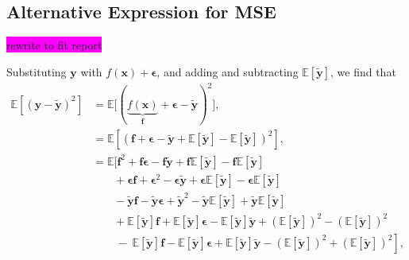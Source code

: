 \documentclass[aps,pra,english,notitlepage,reprint,nofootinbib]{revtex4-1}  %
\begin{document}
\subsection{Alternative Expression for MSE}\label{subapp:cost}
\colorbox{magenta}{rewrite to fit report}

Substituting $\mathbf{y}$ with $f(\mathbf{x}) + \boldsymbol{\epsilon}$, and adding and subtracting $\mathbb{E}\left[\mathbf{\tilde{y}}\right]$, we find that
\begin{align*}
\mathbb{E}\left[(\mathbf{y}-\mathbf{\tilde{y}})^2 \right] 
&= \mathbb{E}\Big[(\underbrace{f(\mathbf{x})}_{\mathbf{f}} + \boldsymbol{\epsilon}-\mathbf{\tilde{y}})^2 \Big],
\\
&= \mathbb{E}\left[(\mathbf{f} + \boldsymbol{\epsilon}-\mathbf{\tilde{y}} + \mathbb{E}\left[\mathbf{\tilde{y}}\right] - \mathbb{E}\left[\mathbf{\tilde{y}}\right])^2\right],
\\
&= \mathbb{E}\Big[\mathbf{f}^2 + \mathbf{f}\boldsymbol{\epsilon} - \mathbf{f}\mathbf{\tilde{y}} + \mathbf{f}\mathbb{E}\left[\mathbf{\tilde{y}}\right] - \mathbf{f}\mathbb{E}\left[\mathbf{\tilde{y}}\right] 
\\
&\hspace{23pt} + \boldsymbol{\epsilon}\mathbf{f} + \boldsymbol{\epsilon}^2 - \boldsymbol{\epsilon}\mathbf{\tilde{y}} + \boldsymbol{\epsilon}\mathbb{E}\left[\mathbf{\tilde{y}}\right] - \boldsymbol{\epsilon}\mathbb{E}\left[\mathbf{\tilde{y}}\right]
\\
&\hspace{23pt} - \mathbf{\tilde{y}}\mathbf{f} - \mathbf{\tilde{y}}\boldsymbol{\epsilon} + \mathbf{\tilde{y}}^2 - \mathbf{\tilde{y}}\mathbb{E}\left[\mathbf{\tilde{y}}\right] + \mathbf{\tilde{y}}\mathbb{E}\left[\mathbf{\tilde{y}}\right]
\\
&\hspace{23pt} + \mathbb{E}\left[\mathbf{\tilde{y}}\right]\mathbf{f} + \mathbb{E}\left[\mathbf{\tilde{y}}\right]\boldsymbol{\epsilon} - \mathbb{E}\left[\mathbf{\tilde{y}}\right]\mathbf{\tilde{y}} + \left(\mathbb{E}\left[\mathbf{\tilde{y}}\right]\right)^2 - \left(\mathbb{E}\left[\mathbf{\tilde{y}}\right]\right)^2
\\
&\hspace{23pt} \left. \:-\: \mathbb{E}\left[\mathbf{\tilde{y}}\right]\mathbf{f} - \mathbb{E}\left[\mathbf{\tilde{y}}\right]\boldsymbol{\epsilon} + \mathbb{E}\left[\mathbf{\tilde{y}}\right]\mathbf{\tilde{y}} - \left(\mathbb{E}\left[\mathbf{\tilde{y}}\right]\right)^2 + \left(\mathbb{E}\left[\mathbf{\tilde{y}}\right]\right)^2 \right],

\end{align*}
\end{document}
